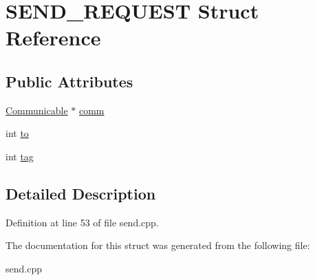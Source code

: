 \hypertarget{structSEND__REQUEST}{
\section{SEND\_\-REQUEST Struct Reference}
\label{structSEND__REQUEST}
}
\subsection*{Public Attributes}
\begin{CompactItemize}
\item 
\hypertarget{structSEND__REQUEST_1ad8f7233fa3ff13262e783a9153920f}{
\hyperlink{classCommunicable}{Communicable} $\ast$ \hyperlink{structSEND__REQUEST_1ad8f7233fa3ff13262e783a9153920f}{comm}}
\label{structSEND__REQUEST_1ad8f7233fa3ff13262e783a9153920f}

\item 
\hypertarget{structSEND__REQUEST_93e2a6a71d2a91aa2b7bdd050ee59b4d}{
int \hyperlink{structSEND__REQUEST_93e2a6a71d2a91aa2b7bdd050ee59b4d}{to}}
\label{structSEND__REQUEST_93e2a6a71d2a91aa2b7bdd050ee59b4d}

\item 
\hypertarget{structSEND__REQUEST_3126b3ef9d6533d3086760e413a7f23f}{
int \hyperlink{structSEND__REQUEST_3126b3ef9d6533d3086760e413a7f23f}{tag}}
\label{structSEND__REQUEST_3126b3ef9d6533d3086760e413a7f23f}

\end{CompactItemize}


\subsection{Detailed Description}




Definition at line 53 of file send.cpp.

The documentation for this struct was generated from the following file:\begin{CompactItemize}
\item 
send.cpp\end{CompactItemize}

